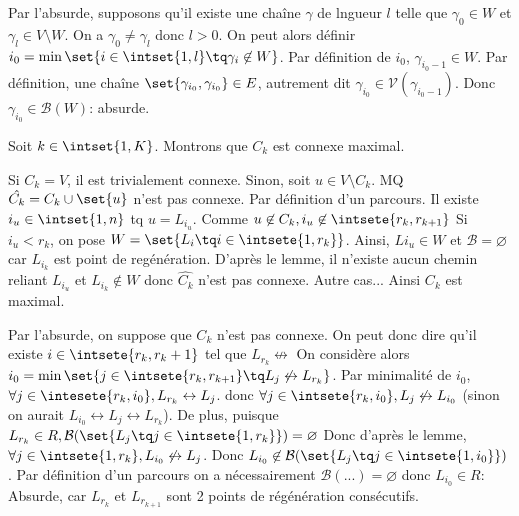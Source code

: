 \documentclass{scrartcl}
\begin{document}
			\begin{demo}
				\item Par l'absurde, supposons qu'il existe une chaîne $\gamma$ de lngueur $l$ telle que $\gamma_0 \in W$ et $\gamma_l \in V\setminus W$.
				On a $\gamma_0 \neq \gamma_l$ donc $l > 0$.
				On peut alors définir $i_0 = \min\set{i \in \intset{1,l} \tq \gamma_i \not\in W}$.
				Par définition de $i_0$, $\gamma_{i_0-1} \in W$.
				Par définition, une chaîne $\set{\gamma_{i_0},\gamma_{i_0}} \in E$, autrement dit $\gamma_{i_0} \in \mathscr{V}(\gamma_{i_0-1})$.
				Donc $\gamma_{i_0} \in \mathcal{B}(W)$: absurde.
			\end{demo}

			\begin{demo}
				\item Soit $k \in \intset{1,K}$. Montrons que $C_k$ est connexe maximal.
				\item Si $C_k = V$, il est trivialement connexe. Sinon, soit $u\in V\setminus C_k$. MQ $\hat{C_k} = C_k\cup\set{u}$  n'est pas connexe.
				Par définition d'un parcours. Il existe $i_u \in \intset{1,n}$ tq $u = L_{i_u}$.
				Comme $u \not\in C_k, i_u \not\in \intsete{r_k,r_{k+1}}$
				Si $i_u < r_k$, on pose $W = \set{L_i \tq i \in \intsete{1,r_k}}$. Ainsi, $L{i_u} \in W$ et $\mathcal{B} = \varnothing$ car 
				$L_{i_k}$ est point de regénération. D'après le lemme, il n'existe aucun chemin reliant $L_{i_u}$ et $L_{i_k} \not \in W$
				donc $\hat{C_k}$ n'est pas connexe.
				Autre cas...
				Ainsi $C_k$ est maximal.

				\item Par l'absurde, on suppose que $C_k$ n'est pas connexe.
				On peut donc dire qu'il existe $i \in \intsete{r_k,r_k+1}$ tel que $L_{r_k} \not\leftrightarrow$
				On considère alors $i_0 = \min\set{j \in \intsete{r_k, r_{k+1}} \tq L_j \not\leftrightarrow L_{r_k}}$.
				Par minimalité de $i_0$, $\forall j \in \intesete{r_k,i_0}, L_{r_k} \leftrightarrow L_j$.
				donc $\forall j \in \intsete{r_k,i_0}, L_j \not\leftrightarrow L_{i_0}$ 
				(sinon on aurait $L_{i_0} \leftrightarrow L_j \leftrightarrow L_{r_k}$).
				De plus, puisque $L_{r_k} \in R, \mathcal{B}(\set{L_j \tq j \in \intsete{1,r_k}}) = \varnothing $
				Donc d'après le lemme, $\forall j \in \intsete{1,r_k}, L_{i_0} \not\leftrightarrow L_j$.
				Donc $L_{i_0} \not\in \mathcal{B}(\set{L_j \tq j \in \intsete{1,i_0}})$.
				Par définition d'un parcours on a nécessairement
				$\mathcal{B}(...) = \varnothing$ donc $L_{i_0} \in R$: 
				Absurde, car $L_{r_k}$ et $L_{r_{k+1}}$ sont 2 points de régénération consécutifs.
			\end{demo}
\end{document}
